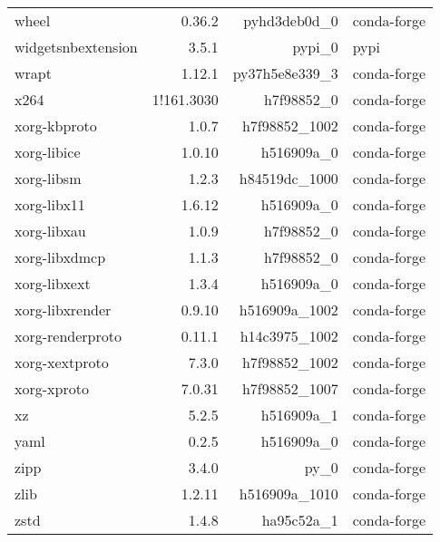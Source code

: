 \begin{table}
\begin{center}
\begin{tabular}{|l|r|r|l|}
			wheel &0.36.2 & pyhd3deb0d\_0 &conda-forge \\
			widgetsnbextension &3.5.1 & pypi\_0 &pypi \\
			wrapt &1.12.1 & py37h5e8e339\_3 &conda-forge \\
			x264 &1!161.3030 & h7f98852\_0 &conda-forge \\
			xorg-kbproto &1.0.7 & h7f98852\_1002 &conda-forge \\
			xorg-libice &1.0.10 & h516909a\_0 &conda-forge \\
			xorg-libsm &1.2.3 & h84519dc\_1000 &conda-forge \\
			xorg-libx11 &1.6.12 & h516909a\_0 &conda-forge \\
			xorg-libxau &1.0.9 & h7f98852\_0 &conda-forge \\
			xorg-libxdmcp &1.1.3 & h7f98852\_0 &conda-forge \\
			xorg-libxext &1.3.4 & h516909a\_0 &conda-forge \\
			xorg-libxrender &0.9.10 & h516909a\_1002 &conda-forge \\
			xorg-renderproto &0.11.1 & h14c3975\_1002 &conda-forge \\
			xorg-xextproto &7.3.0 & h7f98852\_1002 &conda-forge \\
			xorg-xproto &7.0.31 & h7f98852\_1007 &conda-forge \\
			xz &5.2.5 & h516909a\_1 &conda-forge \\
			yaml &0.2.5 & h516909a\_0 &conda-forge \\
			zipp &3.4.0 & py\_0 &conda-forge \\
			zlib &1.2.11 & h516909a\_1010 &conda-forge \\
			zstd &1.4.8 & ha95c52a\_1 &conda-forge \\
		\end{tabular}
	\end{center}
\end{table}			
